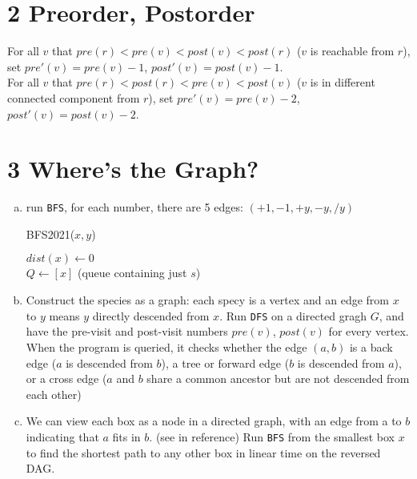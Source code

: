 \documentclass[11pt]{article}
\newenvironment{qparts}{\begin{enumerate}[(a)]}{\end{enumerate}}
\begin{document}
	\section*{2 Preorder, Postorder}
	For all $v$ that $pre(r) < pre(v) < post(v) < post(r)$ ($v$ is reachable from $r$), set $pre'(v) = pre(v)-1$, $post'(v) = post(v) -1$.\\
	For all $v$ that $pre(r) < post(r) < pre(v) < post(v)$ ($v$ is in different connected component from $r$), set $pre'(v) = pre(v)-2$, $post'(v) = post(v) -2$.\\ 
	
	\section*{3 Where's the Graph?}
	\begin{qparts}
		\item run \texttt{BFS}, for each number, there are 5 edges: $(+1, -1, +y, -y, /y)$\\
		\begin{algorithm}[H]
			\caption{BFS2021($x, y$)}
			$dist(x) \leftarrow 0$\\
			$Q \leftarrow [x]$ (queue containing just $s$)\\
		\end{algorithm}
		
		\item Construct the species as a graph: each specy is a vertex and an edge from $x$ to $y$ means $y$ directly descended from $x$. Run \texttt{DFS} on a directed gragh $G$, and have the pre-visit and post-visit numbers $pre(v)$, $post(v)$ for every vertex. When the program is queried, it checks whether the edge $(a, b)$ is a back edge ($a$ is descended from $b$), a tree or forward edge ($b$ is descended from $a$), or a cross edge ($a$ and $b$ share a common ancestor but are not descended from each other)
		
		\item We can view each box as a node in a directed graph, with an edge from a to
		$b$ indicating that $a$ fits in $b$. (see in reference) Run \texttt{BFS} from the smallest box $x$ to find the shortest path to any other box in linear time on the reversed DAG.  
	\end{qparts}
	
\end{document}
